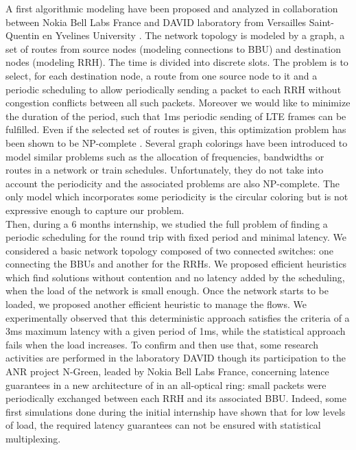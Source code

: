 \documentclass{article}
\begin{document}
A first algorithmic modeling have been proposed and analyzed in collaboration between Nokia Bell Labs France and DAVID laboratory from Versailles Saint-Quentin en Yvelines University \cite{Mael2017}. The network topology is modeled by a graph, a set of routes from source nodes (modeling connections to BBU) and destination nodes (modeling RRH). The time is divided into discrete slots. The problem is to select, for each destination node, a route from one source node to it and a periodic scheduling to allow periodically sending a packet to each RRH without congestion conflicts between all such packets. Moreover we would like to minimize the duration of the period, such that 1ms periodic sending of LTE frames can be fulfilled. Even if the selected set of routes is given, this optimization problem has been shown to be NP-complete \cite{rapportstage}. Several graph colorings have been introduced to model similar problems such as the allocation of frequencies\cite{borndorfer1998frequency}, bandwidths\cite{erlebach2001complexity} or routes\cite{cole1996benefit} in a network or train schedules\cite{strotmann2007railway}. Unfortunately, they do not take into account the periodicity and the associated problems are also NP-complete. The only model which incorporates some periodicity is the circular coloring\cite{zhu2006recent,zhou2013multiple,zhu2001circular} but is not expressive enough to capture our problem.\\

Then, during a 6 months internship, we studied the full problem of finding a periodic scheduling for the round trip with fixed period and minimal latency. We considered a basic network topology composed of two connected switches: one connecting the BBUs and another for the RRHs. We proposed efficient heuristics which find solutions without contention and no latency added by the scheduling, when the load of the network is small enough. Once the network starts to be loaded, we proposed another efficient heuristic to manage the flows. We experimentally observed that this deterministic approach satisfies the criteria of a 3ms maximum latency with a given period of 1ms, while the statistical approach fails when the load increases. To confirm and then use that, some research activities are performed in the laboratory DAVID though its participation to the ANR project N-Green, leaded by Nokia Bell Labs France, concerning latence guarantees in a new architecture of in an all-optical ring: small packets were periodically exchanged between each RRH and its associated BBU. Indeed, some first simulations done during the initial internship have shown that for low levels of load, the required latency guarantees can not be ensured with statistical multiplexing.\\
\end{document}
